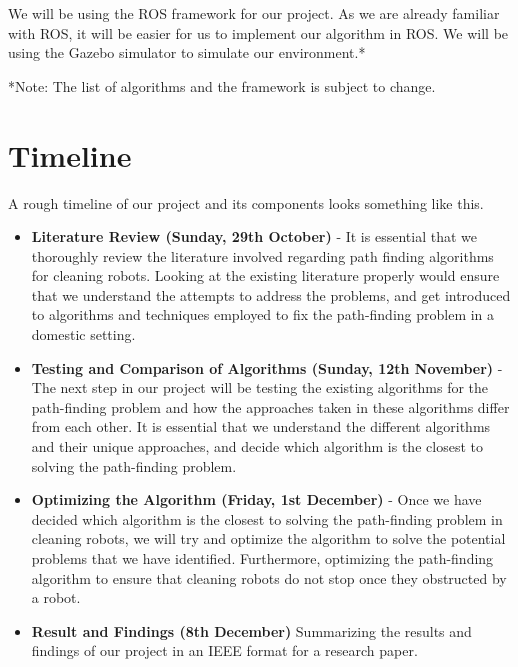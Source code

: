 \documentclass[12pt]{article}
\begin{document}
We will be using the ROS framework for our project. As we are already familiar
with ROS, it will be easier for us to implement our algorithm in ROS. We will
be using the Gazebo simulator to simulate our environment.*


*Note: The list of algorithms and the framework is subject to change. 
\section{Timeline}
A rough timeline of our project and its components looks something like this.

\begin{itemize}
    \item \textbf{Literature Review (Sunday, 29th October)} - It is essential that we thoroughly review the literature involved regarding path finding algorithms for cleaning robots. Looking at the existing literature properly would ensure that we understand the attempts to address the problems, and get introduced to algorithms and techniques employed to fix the path-finding problem in a domestic setting.
    \item \textbf{Testing and Comparison of Algorithms (Sunday, 12th November)} - The next step in our project will be testing the existing algorithms for the path-finding problem and how the approaches taken in these algorithms differ from each other. It is essential that we understand the different algorithms and their unique approaches, and decide which algorithm is the closest to solving the path-finding problem.
    \item \textbf{Optimizing the Algorithm (Friday, 1st December)} - Once we have decided which algorithm is the closest to solving the path-finding problem in cleaning robots, we will try and optimize the algorithm to solve the potential problems that we have identified. Furthermore, optimizing the path-finding algorithm to ensure that cleaning robots do not stop once they obstructed by a robot.
    \item \textbf{Result and Findings (8th December)} Summarizing the results and findings of our project in an IEEE format for a research paper.
\end{itemize}
\end{document}
